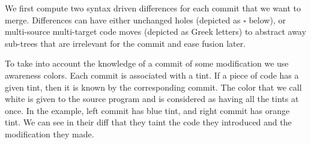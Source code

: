 \documentclass[a4paper,11pt]{article}
\newcommand\id{\square}
\begin{document}
We first compute two syntax driven differences for each commit that we want to merge. Differences can have either unchanged holes (depicted as $\id$ below), or multi-source multi-target code moves (depicted as Greek letters) to abstract away sub-trees that are irrelevant for the commit and ease fusion later.

To take into account the knowledge of a commit of some modification we use awareness colors. Each commit is associated with a tint. If a piece of code has a given tint, then it is known by the corresponding commit. The color that we call white is given to the source program and is considered as having all the tints at once. In the example, left commit has blue tint, and right commit has orange tint. We can see in their diff that they taint the code they introduced and the modification they made.
\end{document}
